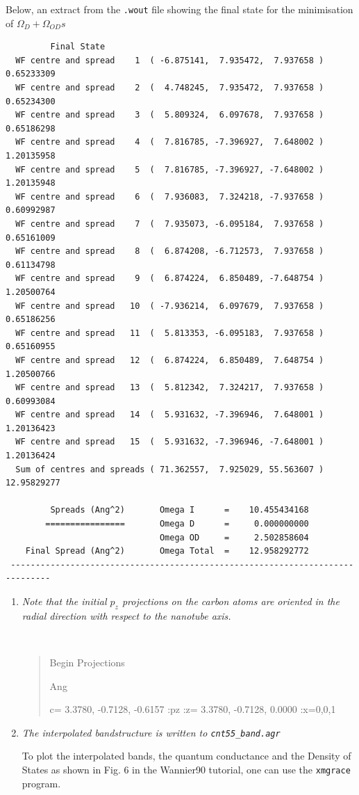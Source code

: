 \newpage
Below, an extract from the {\tt .wout} file showing the final state for the minimisation of $\Omega_D + \Omega_{OD}s$
\begin{tcolorbox}[sharp corners,boxrule=0.5pt]
\small{
\begin{verbatim}
    	 Final State
  WF centre and spread    1  ( -6.875141,  7.935472,  7.937658 )     0.65233309
  WF centre and spread    2  (  4.748245,  7.935472,  7.937658 )     0.65234300
  WF centre and spread    3  (  5.809324,  6.097678,  7.937658 )     0.65186298
  WF centre and spread    4  (  7.816785, -7.396927,  7.648002 )     1.20135958
  WF centre and spread    5  (  7.816785, -7.396927, -7.648002 )     1.20135948
  WF centre and spread    6  (  7.936083,  7.324218, -7.937658 )     0.60992987
  WF centre and spread    7  (  7.935073, -6.095184,  7.937658 )     0.65161009
  WF centre and spread    8  (  6.874208, -6.712573,  7.937658 )     0.61134798
  WF centre and spread    9  (  6.874224,  6.850489, -7.648754 )     1.20500764
  WF centre and spread   10  ( -7.936214,  6.097679,  7.937658 )     0.65186256
  WF centre and spread   11  (  5.813353, -6.095183,  7.937658 )     0.65160955
  WF centre and spread   12  (  6.874224,  6.850489,  7.648754 )     1.20500766
  WF centre and spread   13  (  5.812342,  7.324217,  7.937658 )     0.60993084
  WF centre and spread   14  (  5.931632, -7.396946,  7.648001 )     1.20136423
  WF centre and spread   15  (  5.931632, -7.396946, -7.648001 )     1.20136424
  Sum of centres and spreads ( 71.362557,  7.925029, 55.563607 )    12.95829277

         Spreads (Ang^2)       Omega I      =    10.455434168
        ================       Omega D      =     0.000000000
                               Omega OD     =     2.502858604
    Final Spread (Ang^2)       Omega Total  =    12.958292772
 ------------------------------------------------------------------------------
 \end{verbatim}
 }
 \end{tcolorbox}


\begin{enumerate}\addtocounter{enumi}{1}
 \item {\it Note that the initial $p_z$ projections on the carbon atoms are oriented in the radial direction with
respect to the nanotube axis.}

{\tt
\begin{quote}

Begin Projections

Ang

c=   3.3780, -0.7128, -0.6157 :pz {\color{red}:z=  3.3780, -0.7128,  0.0000 :x=0,0,1}

\end{quote}
}

\item {\it The interpolated bandstructure is written to {\tt cnt55\_band.agr}}

To plot the interpolated bands, the quantum conductance and the Density of States as shown in Fig. 6 in the {\sc Wannier90} tutorial, one can use the {\tt xmgrace} program.
\end{enumerate}

